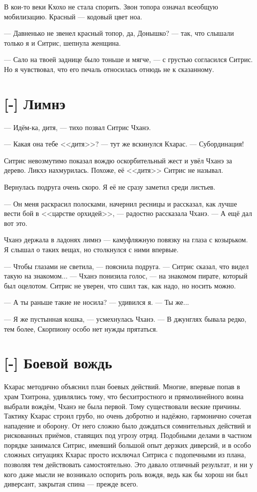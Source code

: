 В кои-то веки Кхохо не стала спорить.
Звон топора означал всеобщую мобилизацию.
Красный --- кодовый цвет ноа.

--- Давненько не звенел красный топор, да, Донышко? --- так, что слышали только я и Ситрис, шепнула женщина.

--- Сало на твоей заднице было тоньше и мягче, --- с грустью согласился Ситрис.
Но я чувствовал, что его печаль относилась отнюдь не к сказанному.

\section{[-] Лимнэ}

\textspace

--- Идём-ка, дитя, --- тихо позвал Ситрис Чханэ.

--- Какая она тебе <<дитя>>? --- тут же вскинулся Кхарас.
--- Субординация!

Ситрис невозмутимо показал вождю оскорбительный жест и увёл Чханэ за дерево.
Ликхэ нахмурилась.
Похоже, её <<дитя>> Ситрис не называл.

Вернулась подруга очень скоро.
Я её не сразу заметил среди листьев.

--- Он меня раскрасил полосками, начернил ресницы и рассказал, как лучше вести бой в <<царстве орхидей>>, --- радостно рассказала Чханэ.
--- А ещё дал вот это.

Чханэ держала в ладонях лимнэ --- камуфляжную повязку на глаза с козырьком.
Я слышал о таких вещах, но столкнулся с ними впервые.

--- Чтобы глазами не светила, --- пояснила подруга.
--- Ситрис сказал, что видел такую на знакомом... --- Чханэ понизила голос, --- на знакомом пирате, который был оцелотом.
Ситрис не уверен, что сшил так, как надо, но носить можно.

--- А ты раньше такие не носила? --- удивился я.
--- Ты же...

--- Я же пустынная кошка, --- усмехнулась Чханэ.
--- В джунглях бывала редко, тем более, Скорпиону особо нет нужды прятаться.

\section{[-] Боевой вождь}

\textspace

Кхарас методично объяснил план боевых действий.
Многие, впервые попав в храм Тхитрона, удивлялись тому, что бесхитростного и прямолинейного воина выбрали вождём, Чханэ не была первой.
Тому существовали веские причины.
Тактику Кхарас строил грубо, но очень добротно и надёжно, гармонично сочетая нападение и оборону.
От него сложно было дождаться сомнительных действий и рискованных приёмов, ставящих под угрозу отряд.
Подобными делами в частном порядке занимался Ситрис, имевший большой опыт дерзких диверсий, и в особо сложных ситуациях Кхарас просто исключал Ситриса с подопечными из плана, позволяя тем действовать самостоятельно.
Это давало отличный результат, и ни у кого даже мысли не возникало оспорить роль вождя, ведь как бы хорош ни был диверсант, закрытая спина --- прежде всего.

